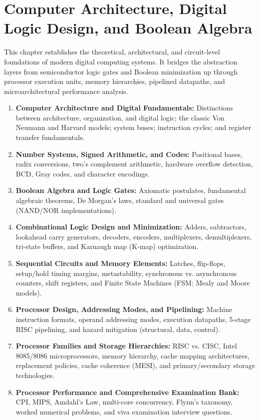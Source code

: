 
\chapter{Computer Architecture, Digital Logic Design, and Boolean Algebra}
\label{ch:computer_architecture_digital_logic}

This chapter establishes the theoretical, architectural, and circuit-level foundations of modern digital computing systems. It bridges the abstraction layers from semiconductor logic gates and Boolean minimization up through processor execution units, memory hierarchies, pipelined datapaths, and microarchitectural performance analysis.

\begin{enumerate}[label=\bfseries\arabic*.]
    \item \textbf{Computer Architecture and Digital Fundamentals:} Distinctions between architecture, organization, and digital logic; the classic Von Neumann and Harvard models; system buses; instruction cycles; and register transfer fundamentals.
    \item \textbf{Number Systems, Signed Arithmetic, and Codes:} Positional bases, radix conversions, two's complement arithmetic, hardware overflow detection, BCD, Gray codes, and character encodings.
    \item \textbf{Boolean Algebra and Logic Gates:} Axiomatic postulates, fundamental algebraic theorems, De Morgan's laws, standard and universal gates (NAND/NOR implementations).
    \item \textbf{Combinational Logic Design and Minimization:} Adders, subtractors, lookahead carry generators, decoders, encoders, multiplexers, demultiplexers, tri-state buffers, and Karnaugh map (K-map) optimization.
    \item \textbf{Sequential Circuits and Memory Elements:} Latches, flip-flops, setup/hold timing margins, metastability, synchronous vs. asynchronous counters, shift registers, and Finite State Machines (FSM: Mealy and Moore models).
    \item \textbf{Processor Design, Addressing Modes, and Pipelining:} Machine instruction formats, operand addressing modes, execution datapaths, 5-stage RISC pipelining, and hazard mitigation (structural, data, control).
    \item \textbf{Processor Families and Storage Hierarchies:} RISC vs. CISC, Intel 8085/8086 microprocessors, memory hierarchy, cache mapping architectures, replacement policies, cache coherence (MESI), and primary/secondary storage technologies.
    \item \textbf{Processor Performance and Comprehensive Examination Bank:} CPI, MIPS, Amdahl's Law, multi-core concurrency, Flynn's taxonomy, worked numerical problems, and viva examination interview questions.
\end{enumerate}


